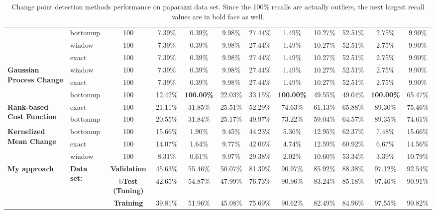 \begin{table}
{\begin{tabular}{llcccccccccc}
    & bottomup & 100  &        7.39\% &     0.39\% &  9.98\% &        27.44\% &      1.49\% & 10.27\% &        52.51\% &      2.75\% &  9.90\% \\
    & window & 100  &        7.39\% &     0.39\% &  9.98\% &        27.44\% &      1.49\% & 10.27\% &        52.51\% &      2.75\% &  9.90\% \\
    & exact & 100  &        7.39\% &     0.39\% &  9.98\% &        27.44\% &      1.49\% & 10.27\% &        52.51\% &      2.75\% &  9.90\% \\ \midrule
\multirow{3}{*}{\textbf{Gaussian Process Change}}
    & window & 100  &        7.39\% &     0.39\% &  9.98\% &        27.44\% &      1.49\% & 10.27\% &        52.51\% &      2.75\% &  9.90\% \\
    & exact & 100  &        7.39\% &     0.39\% &  9.98\% &        27.44\% &      1.49\% & 10.27\% &        52.51\% &      2.75\% &  9.90\% \\
    & bottomup & 100  &       12.42\% &   \textbf{100.00\%} & 22.03\% &        33.15\% &    \textbf{100.00\%} & 49.55\% &        49.04\% &    \textbf{100.00\%} & 65.47\% \\ \midrule
\multirow{2}{*}{\textbf{Rank-based Cost Function}}
    & exact & 100  &       21.11\% &    31.85\% & 25.51\% &        52.29\% &     74.63\% & 61.13\% &        65.88\% &     89.30\% & 75.46\% \\
    & bottomup & 100  &       20.55\% &    31.84\% & 25.17\% &        49.97\% &     73.22\% & 59.04\% &        64.57\% &     89.35\% & 74.61\% \\ \midrule
\multirow{3}{*}{\textbf{Kernelized Mean Change}} 
    & bottomup & 100  &       15.66\% &     1.90\% &  9.45\% &        44.23\% &      5.36\% & 12.95\% &        62.37\% &      7.48\% & 15.66\% \\
    & exact & 100  &       14.07\% &     1.64\% &  9.77\% &        42.06\% &      4.74\% & 12.59\% &        60.92\% &      6.67\% & 14.56\% \\
    & window & 100  &        8.31\% &     0.61\% &  9.97\% &        29.38\% &      2.02\% & 10.60\% &        53.34\% &      3.39\% & 10.79\% \\ \midrule \midrule
\multirow{3}{*}{\textbf{My approach}} 
    & \multirow{3}{*}{\textbf{Data set:}}  
         & \textbf{Validation} &  45.63\% &    55.46\% & 50.07\% &   81.39\% &     90.97\% & 85.92\% &   88.38\% &     97.12\% & 92.54\%  \\
    & {} & b\textbf{Test (Tuning)} &  42.65\% &    54.87\% & 47.99\% &   76.73\% &     90.96\% & 83.24\% &   85.18\% &     97.46\% & 90.91\%  \\
    & {} & \textbf{Training}  &  39.81\% &    51.96\% & 45.08\% &   75.69\% &     90.62\% & 82.49\% &   84.96\% &     97.55\% & 90.82\%  \\
\bottomrule
\end{tabular}%
}
    \caption{Change point detection methods performance on paparazzi data set. Since the 100\% recalls are actually outliers, the next largest recall values are in bold face as well.}
    \label{tab:cpd_paparazzi}
\end{table}

